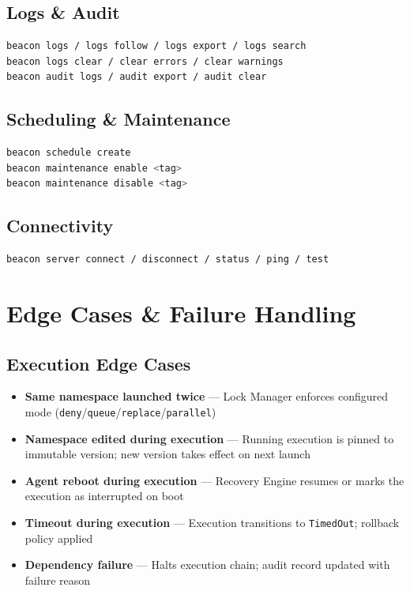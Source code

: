 \documentclass[12pt,a4paper]{article}
\begin{document}
\subsection{Logs \& Audit}

\begin{lstlisting}[language=bash]
beacon logs / logs follow / logs export / logs search
beacon logs clear / clear errors / clear warnings
beacon audit logs / audit export / audit clear
\end{lstlisting}

\subsection{Scheduling \& Maintenance}

\begin{lstlisting}[language=bash]
beacon schedule create
beacon maintenance enable <tag>
beacon maintenance disable <tag>
\end{lstlisting}

\subsection{Connectivity}

\begin{lstlisting}[language=bash]
beacon server connect / disconnect / status / ping / test
\end{lstlisting}

\section{Edge Cases \& Failure Handling}

\subsection{Execution Edge Cases}

\begin{itemize}[noitemsep]
    \item \textbf{Same namespace launched twice} — Lock Manager enforces configured mode (\texttt{deny}/\texttt{queue}/\texttt{replace}/\texttt{parallel})
    \item \textbf{Namespace edited during execution} — Running execution is pinned to immutable version; new version takes effect on next launch
    \item \textbf{Agent reboot during execution} — Recovery Engine resumes or marks the execution as interrupted on boot
    \item \textbf{Timeout during execution} — Execution transitions to \texttt{TimedOut}; rollback policy applied
    \item \textbf{Dependency failure} — Halts execution chain; audit record updated with failure reason
\end{itemize}
\end{document}
